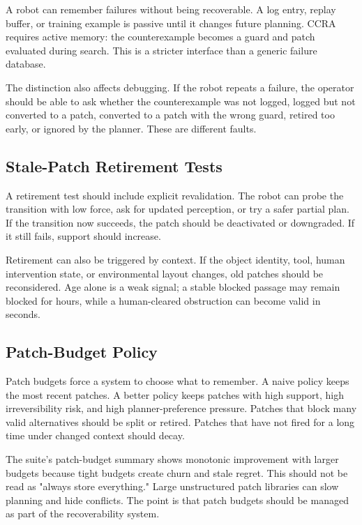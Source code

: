 \documentclass{article}
\newcommand{\ccra}{\textsc{CCRA}}
\begin{document}
A robot can remember failures without being recoverable. A log entry, replay
buffer, or training example is passive until it changes future planning. \ccra{}
requires active memory: the counterexample becomes a guard and patch evaluated
during search. This is a stricter interface than a generic failure database.

The distinction also affects debugging. If the robot repeats a failure, the
operator should be able to ask whether the counterexample was not logged, logged
but not converted to a patch, converted to a patch with the wrong guard, retired
too early, or ignored by the planner. These are different faults.

\subsection{Stale-Patch Retirement Tests}

A retirement test should include explicit revalidation. The robot can probe the
transition with low force, ask for updated perception, or try a safer partial
plan. If the transition now succeeds, the patch should be deactivated or
downgraded. If it still fails, support should increase.

Retirement can also be triggered by context. If the object identity, tool,
human intervention state, or environmental layout changes, old patches should
be reconsidered. Age alone is a weak signal; a stable blocked passage may
remain blocked for hours, while a human-cleared obstruction can become valid in
seconds.

\subsection{Patch-Budget Policy}

Patch budgets force a system to choose what to remember. A naive policy keeps
the most recent patches. A better policy keeps patches with high support, high
irreversibility risk, and high planner-preference pressure. Patches that block
many valid alternatives should be split or retired. Patches that have not fired
for a long time under changed context should decay.

The suite's patch-budget summary shows monotonic improvement with larger
budgets because tight budgets create churn and stale regret. This should not be
read as "always store everything." Large unstructured patch libraries can slow
planning and hide conflicts. The point is that patch budgets should be managed
as part of the recoverability system.
\end{document}
